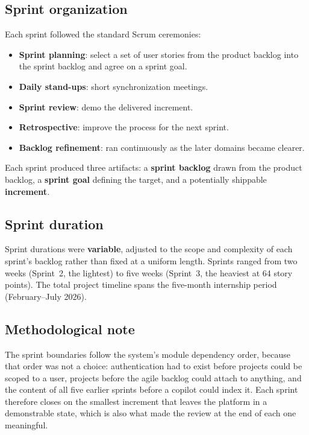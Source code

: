 \subsection{Sprint organization}

Each sprint followed the standard Scrum ceremonies:

\begin{itemize}
  \item \textbf{Sprint planning}: select a set of user stories from the product backlog into the
    sprint backlog and agree on a sprint goal.
  \item \textbf{Daily stand-ups}: short synchronization meetings.
  \item \textbf{Sprint review}: demo the delivered increment.
  \item \textbf{Retrospective}: improve the process for the next sprint.
  \item \textbf{Backlog refinement}: ran continuously as the later domains became clearer.
\end{itemize}

Each sprint produced three artifacts: a \textbf{sprint backlog} drawn from the product backlog, a
\textbf{sprint goal} defining the target, and a potentially shippable \textbf{increment}.

\subsection{Sprint duration}

Sprint durations were \textbf{variable}, adjusted to the scope and complexity of each sprint's
backlog rather than fixed at a uniform length. Sprints ranged from two weeks (Sprint~2, the
lightest) to five weeks (Sprint~3, the heaviest at 64 story points). The total project timeline
spans the five-month internship period (February--July 2026).

\subsection{Methodological note}

The sprint boundaries follow the system's module dependency order, because that order was not a
choice: authentication had to exist before projects could be scoped to a user, projects before
the agile backlog could attach to anything, and the content of all five earlier sprints before a
copilot could index it. Each sprint therefore closes on the smallest increment that leaves the
platform in a demonstrable state, which is also what made the review at the end of each one
meaningful.

